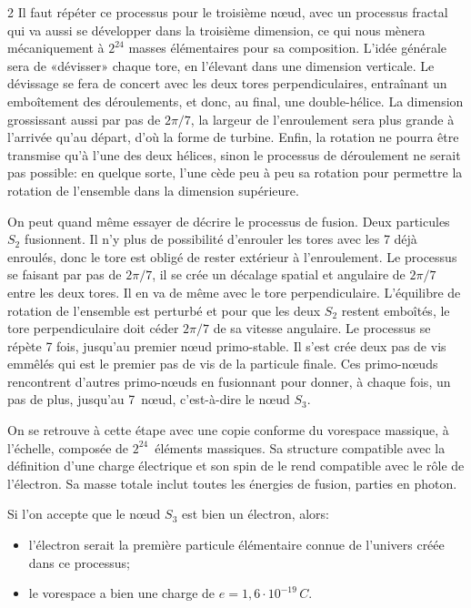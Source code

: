 \begin{multicols}{2}
Il faut répéter ce processus pour le troisième nœud, avec un
processus fractal qui va aussi se développer dans la troisième
dimension, ce qui nous mènera mécaniquement à $2^{24}$ masses élémentaires
pour sa composition. L'idée générale sera de «dévisser» chaque tore,
en l'élevant dans une dimension verticale. Le dévissage se fera de
concert avec les deux tores perpendiculaires, entraînant un
emboîtement des déroulements, et donc, au final, une double-hélice. La
dimension grossissant aussi par pas de $2\pi/7$, la largeur de
l'enroulement sera plus grande à l'arrivée qu'au départ, d'où la forme
de turbine. Enfin, la rotation ne pourra être transmise qu'à l'une
des deux hélices, sinon le processus de déroulement ne serait pas
possible: en quelque sorte, l'une cède peu à peu sa rotation pour
permettre la rotation de l'ensemble dans la dimension supérieure.

On peut quand même essayer de décrire le processus de fusion. Deux
particules $S_2$ fusionnent. Il n'y plus de possibilité d'enrouler les
tores avec les 7 déjà enroulés, donc le tore est obligé de rester
extérieur à l'enroulement. Le processus se faisant par pas de $2\pi/7$,
il se crée un décalage spatial et angulaire de $2\pi/7$ entre les deux
tores. Il en va de même avec le tore perpendiculaire. L'équilibre de
rotation de l'ensemble est perturbé et pour que les deux $S_2$ restent
emboîtés, le tore perpendiculaire doit céder $2\pi/7$ de sa vitesse
angulaire. Le processus se répète 7 fois, jusqu'au premier nœud
primo-stable. Il s'est crée deux pas de vis emmêlés qui est le premier
pas de vis de la particule finale. Ces primo-nœuds rencontrent
d'autres primo-nœuds en fusionnant pour donner, à chaque fois, un pas
de plus, jusqu'au 7\ieme\ nœud, c'est-à-dire le nœud $S_3$.

On se retrouve à cette étape avec une copie conforme du vorespace massique, à
l'échelle, composée de $2^{24}$~éléments massiques. Sa
structure compatible avec la définition d'une charge électrique et son
spin de  le rend compatible avec le rôle de l'électron. Sa masse
totale inclut toutes les énergies de fusion, parties en photon.

Si l'on accepte que le nœud $S_3$ est bien un électron, alors:

\begin{itemize}
	\item l'électron serait la première particule élémentaire connue de l'univers
	créée dans ce processus;
	\item le vorespace a bien une charge de $e=1,6 \cdot 10^{-19}\,C$.
\end{itemize}


\end{multicols}
